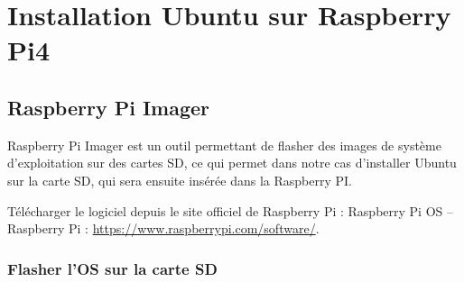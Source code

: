 \chapter{Installation Ubuntu sur Raspberry Pi4}

\section{Raspberry Pi Imager}

Raspberry Pi Imager est un outil permettant de flasher des images de système d'exploitation sur des cartes SD, ce qui permet dans notre cas d'installer Ubuntu sur la carte SD, qui sera ensuite insérée dans la Raspberry PI.

 Télécharger le logiciel depuis le site officiel de Raspberry Pi : Raspberry Pi OS – Raspberry Pi : \url{https://www.raspberrypi.com/software/}.

 



\subsection{Flasher l'OS sur la carte SD}


